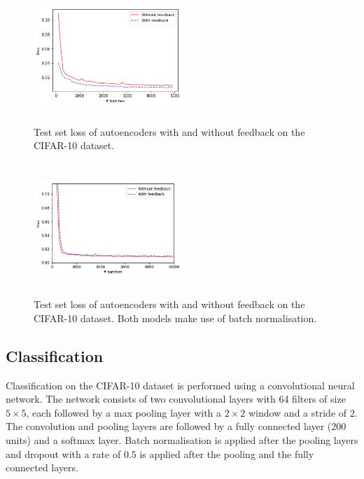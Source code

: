 \documentclass{article}
\begin{document}
\begin{figure}
      \centering
      \includegraphics[width=0.5\textwidth,height=5cm,keepaspectratio]{img/cifar_auto_test_loss.png}
      \caption{Test set loss of autoencoders with and without feedback on the CIFAR-10 dataset.}
      \label{fig:cifarauto}
  \end{figure}
  
  \begin{figure}
      \centering
      \includegraphics[width=0.5\textwidth,height=5cm,keepaspectratio]{img/cifar_auto_batch_test_loss.png}
      \caption{Test set loss of autoencoders with and without feedback on the CIFAR-10 dataset. Both models make use of batch normalisation. }
      \label{fig:cifarautobatch}
  \end{figure}



\subsection{Classification} 
Classification on the CIFAR-10 dataset is performed using a convolutional neural network. The network consists of two convolutional layers with 64 filters of size $5 \times 5$, each followed by a max pooling layer with a $2\times2$ window and a stride of $2$. The convolution  and pooling layers are followed by a fully connected layer (200 units) and a softmax layer. 
Batch normalisation is applied after the pooling layers and dropout with a rate of $0.5$ is applied after the pooling and the fully connected layers. 
\end{document}
